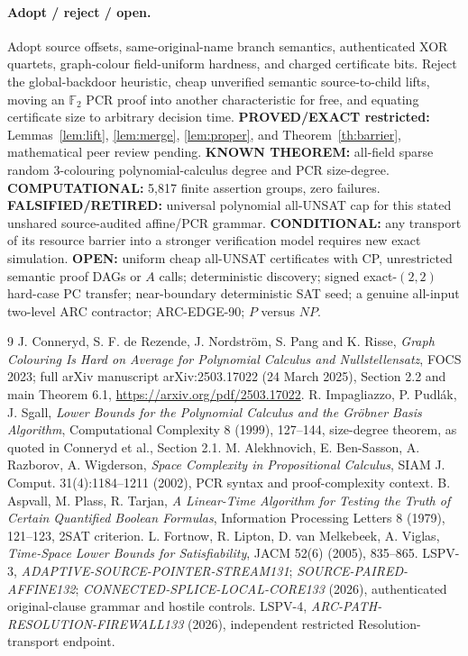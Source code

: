 \documentclass[11pt]{article}
\begin{document}
\paragraph{Adopt / reject / open.} Adopt source offsets, same-original-name branch semantics, authenticated XOR quartets, graph-colour field-uniform hardness, and charged certificate bits. Reject the global-backdoor heuristic, cheap unverified semantic source-to-child lifts, moving an \(\mathbb F_2\) PCR proof into another characteristic for free, and equating certificate size to arbitrary decision time. \textbf{PROVED/EXACT restricted:} Lemmas~\ref{lem:lift}, \ref{lem:merge}, \ref{lem:proper}, and Theorem~\ref{th:barrier}, mathematical peer review pending. \textbf{KNOWN THEOREM:} all-field sparse random 3-colouring polynomial-calculus degree and PCR size-degree. \textbf{COMPUTATIONAL:} 5,817 finite assertion groups, zero failures. \textbf{FALSIFIED/RETIRED:} universal polynomial all-UNSAT cap for this stated unshared source-audited affine/PCR grammar. \textbf{CONDITIONAL:} any transport of its resource barrier into a stronger verification model requires new exact simulation. \textbf{OPEN:} uniform cheap all-UNSAT certificates with CP, unrestricted semantic proof DAGs or $A$ calls; deterministic discovery; signed exact-$(2,2)$ hard-case PC transfer; near-boundary deterministic SAT seed; a genuine all-input two-level ARC contractor; ARC-EDGE-90; $P$ versus $NP$.

\begin{thebibliography}{9}
 J. Conneryd, S. F. de Rezende, J. Nordstr\"om, S. Pang and K. Risse, \emph{Graph Colouring Is Hard on Average for Polynomial Calculus and Nullstellensatz}, FOCS 2023; full arXiv manuscript arXiv:2503.17022 (24 March 2025), Section 2.2 and main Theorem 6.1, \url{https://arxiv.org/pdf/2503.17022}.
 R. Impagliazzo, P. Pudl\'ak, J. Sgall, \emph{Lower Bounds for the Polynomial Calculus and the Gr\"obner Basis Algorithm}, Computational Complexity 8 (1999), 127--144, size-degree theorem, as quoted in Conneryd et al., Section 2.1.
 M. Alekhnovich, E. Ben-Sasson, A. Razborov, A. Wigderson, \emph{Space Complexity in Propositional Calculus}, SIAM J. Comput. 31(4):1184--1211 (2002), PCR syntax and proof-complexity context.
 B. Aspvall, M. Plass, R. Tarjan, \emph{A Linear-Time Algorithm for Testing the Truth of Certain Quantified Boolean Formulas}, Information Processing Letters 8 (1979), 121--123, 2SAT criterion.
 L. Fortnow, R. Lipton, D. van Melkebeek, A. Viglas, \emph{Time-Space Lower Bounds for Satisfiability}, JACM 52(6) (2005), 835--865.
 LSPV-3, \emph{ADAPTIVE-SOURCE-POINTER-STREAM131}; \emph{SOURCE-PAIRED-AFFINE132}; \emph{CONNECTED-SPLICE-LOCAL-CORE133} (2026), authenticated original-clause grammar and hostile controls.
 LSPV-4, \emph{ARC-PATH-RESOLUTION-FIREWALL133} (2026), independent restricted Resolution-transport endpoint.
\end{thebibliography}
\end{document}
